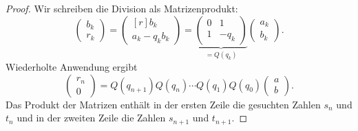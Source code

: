 \begin{proof}
Wir schreiben die Division als Matrizenprodukt:
\[
\begin{pmatrix}
b_k\\
r_k
\end{pmatrix}
=
\begin{pmatrix*}[r]
b_k\\
a_k-q_kb_k
\end{pmatrix*}
=
\underbrace{
\begin{pmatrix}
 0 & 1   \\
 1 &-q_k
\end{pmatrix}
}_{\displaystyle = Q(q_k)}
\begin{pmatrix}
a_k\\
b_k
\end{pmatrix}.
\]
Wiederholte Anwendung ergibt
\[
\begin{pmatrix}
r_n\\
0
\end{pmatrix}
=
Q(q_{n+1})
Q(q_n)
\cdots
Q(q_1)
Q(q_0)
\begin{pmatrix}
a\\ b
\end{pmatrix}.
\]
Das Produkt der Matrizen enthält in der ersten Zeile die gesuchten
Zahlen $s_n$ und $t_n$ und in der zweiten Zeile die Zahlen
$s_{n+1}$ und $t_{n+1}$.


\end{proof}
